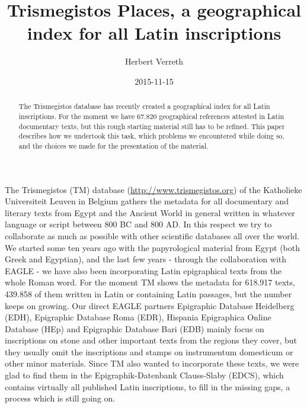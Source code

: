 \documentclass[amsthm,ebook]{saparticle}
\title{Trismegistos Places, a geographical index for all Latin inscriptions}
\author[KUL]{Herbert Verreth\corref{first}}
\date{2015-11-15}
\begin{document}
\maketitle
\begin{abstract}
The Trismegistos database has recently created a geographical index for all Latin inscriptions. For the moment we have
67.820 geographical references attested in Latin documentary texts, but this rough starting material still has to be
refined. This paper describes how we undertook this task, which problems we encountered while doing so, and the choices
we made for the presentation of the material.
\end{abstract}


\noindent The Trismegistos (TM) database (\url{http://www.trismegistos.org}) of the Katholieke Universiteit Leuven in Belgium
gathers the metadata for all documentary and literary texts from Egypt and the Ancient World in general written in
whatever language or script between 800 BC and 800 AD. In this respect we try to collaborate as much as possible with
other scientific databases all over the world. We started some ten years ago with the papyrological material from Egypt
(both Greek and Egyptian), and the last few years - through the collaboration with EAGLE - we have also been
incorporating Latin epigraphical texts from the whole Roman word. For the moment TM shows the metadata for 618.917
texts, 439.858 of them written in Latin or containing Latin passages, but the number keeps on growing. Our direct EAGLE
partners Epigraphic Database Heidelberg (EDH), Epigraphic Database Roma (EDR), Hispania Epigraphica Online Database
(HEp) and Epigraphic Database Bari (EDB) mainly focus on inscriptions on stone and other important texts from the
regions they cover, but they usually omit the inscriptions and stamps on instrumentum domesticum or other minor
materials. Since TM also wanted to incorporate these texts, we were glad to find them in the Epigraphik-Datenbank
Clauss-Slaby (EDCS), which contains virtually all published Latin inscriptions, to fill in the missing gaps, a process
which is still going on.
\end{document}
